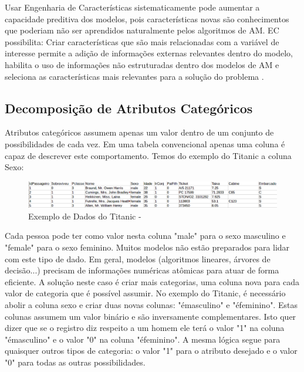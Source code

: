 Usar Engenharia de Características sistematicamente pode aumentar a capacidade preditiva dos modelos, pois características novas são conhecimentos que poderiam não ser aprendidos naturalmente pelos algoritmos de AM. EC possibilita: Criar características que são mais relacionadas com a variável de interesse permite a adição de informações externas relevantes dentro do modelo, habilita o uso de informações não estruturadas dentro dos modelos de AM e seleciona as características mais relevantes para a solução do problema \cite{real2013}.

\subsection{Decomposição de Atributos Categóricos}
Atributos categóricos assumem apenas um valor dentro de um conjunto de possibilidades de cada vez. Em uma tabela convencional apenas uma coluna é capaz de descrever este comportamento. Temos do exemplo do Titanic a coluna Sexo: 

\begin{figure}[!h]
\centering
\includegraphics[keepaspectratio=true,scale=0.40]
{figuras/dataEg.eps}
\caption{Exemplo de Dados do Titanic - \cite{titanic2012}}
\label{data_titatic}
\end{figure}

Cada pessoa pode ter como valor nesta coluna "male" para o sexo masculino e "female" para o sexo feminino. Muitos modelos não estão preparados para lidar com este tipo de dado. Em geral, modelos (algoritmos lineares, árvores de decisão...) precisam de informações numéricas atômicas para atuar de forma eficiente. A solução neste caso é criar mais categorias, uma coluna nova para cada valor de categoria que é possível assumir. No exemplo do Titanic, é necessário abolir a coluna sexo e criar duas novas colunas: "émasculino" e "éfeminino". Estas colunas assumem um valor binário e são inversamente complementares. Isto quer dizer que se o registro diz respeito a um homem ele terá o valor "1" na coluna "émasculino" e o valor "0" na coluna "éfeminino". A mesma lógica segue para quaisquer outros tipos de categoria: o valor "1" para o atributo desejado e o valor "0" para todas as outras possibilidades.

